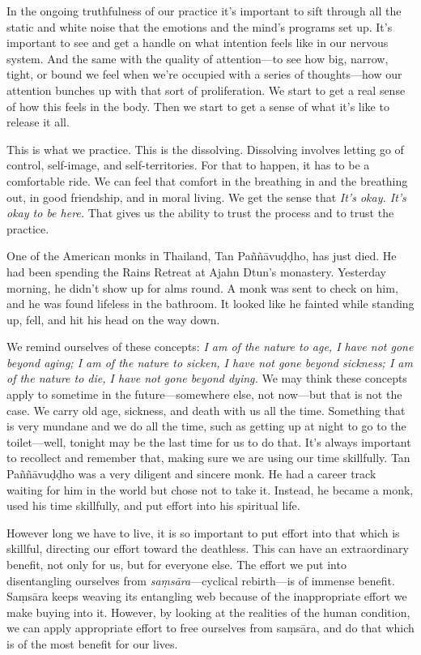 In the ongoing truthfulness of our practice it's important to sift 
through all the static and white noise that the emotions and the mind's 
programs set up. It's important to see and get a handle on what 
intention feels like in our nervous system. And the same with the 
quality of attention---to see how big, narrow, tight, or bound we feel 
when we're occupied with a series of thoughts---how our attention 
bunches up with that sort of proliferation. We start to get a real 
sense of how this feels in the body. Then we start to get a sense of 
what it's like to release it all.

This is what we practice. This is the dissolving. Dissolving involves 
letting go of control, self-image, and self-territories. For that to 
happen, it has to be a comfortable ride. We can feel that comfort in 
the breathing in and the breathing out, in good friendship, and in 
moral living. We get the sense that \emph{It's okay. It's okay to be 
here.} That gives us the ability to trust the process and to trust the 
practice.


One of the American monks in Thailand, Tan Paññāvuḍḍho, has just 
died. He had been spending the Rains Retreat at Ajahn Dtun's monastery. 
Yesterday morning, he didn't show up for alms round. A monk was sent to 
check on him, and he was found lifeless in the bathroom. It looked like 
he fainted while standing up, fell, and hit his head on the way down.

We remind ourselves of these concepts: \emph{I am of the nature to age, 
I have not gone beyond aging; I am of the nature to sicken, I have not 
gone beyond sickness; I am of the nature to die, I have not gone beyond 
dying.} We may think these concepts apply to sometime in the 
future---somewhere else, not now---but that is not the case. We carry 
old age, sickness, and death with us all the time. Something that is 
very mundane and we do all the time, such as getting up at night to go 
to the toilet---well, tonight may be the last time for us to do that. 
It's always important to recollect and remember that, making sure we 
are using our time skillfully. Tan Paññāvuḍḍho was a very 
diligent and sincere monk. He had a career track waiting for him in the 
world but chose not to take it. Instead, he became a monk, used his 
time skillfully, and put effort into his spiritual life.

However long we have to live, it is so important to put effort into 
that which is skillful, directing our effort toward the deathless. This 
can have an extraordinary benefit, not only for us, but for everyone 
else. The effort we put into disentangling ourselves from 
\emph{saṃsāra}---cyclical rebirth---is of immense benefit. 
Saṃsāra keeps weaving its entangling web because of the 
inappropriate effort we make buying into it. However, by looking at the 
realities of the human condition, we can apply appropriate effort to 
free ourselves from saṃsāra, and do that which is of the most 
benefit for our lives.

